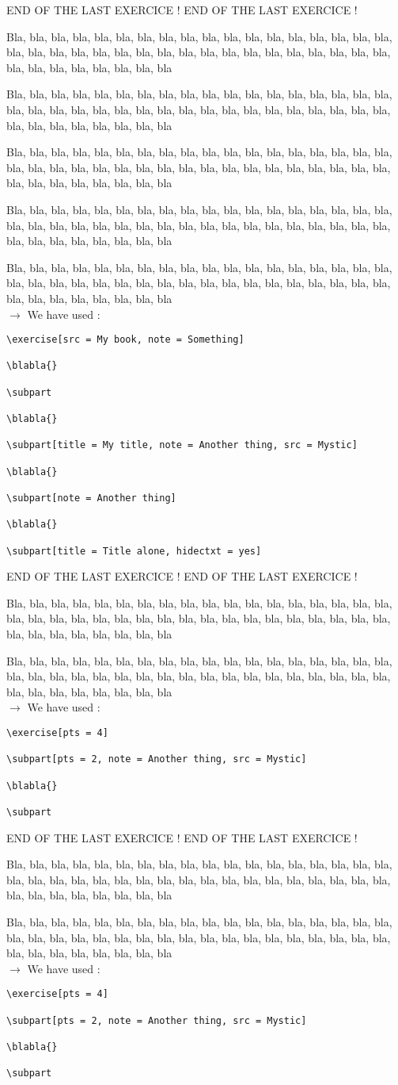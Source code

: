 \documentclass[12pt]{article}
\newcommand\blabla{%
		\noindent Bla, bla, bla, bla, bla, bla, bla, bla, bla, bla, bla,
		bla, bla, bla, bla, bla, bla, bla, bla, bla, bla, bla,
		bla, bla, bla, bla, bla, bla, bla, bla, bla, bla, bla,
		bla, bla, bla, bla, bla, bla, bla, bla, bla, bla, bla
	}
\newcommand\codeused{
		\blabla{} \medskip  \\ \noindent $\rightarrow$ We have used :
	}
\begin{document}
\newpage \medskip \noindent END OF THE LAST EXERCICE ! END OF THE LAST EXERCICE !

\exercise[src = My book, note = Something]
      
\blabla{}

\subpart

\blabla{}

\subpart[pts = 2, title = My title, note = Another thing, src = Mystic]

\blabla{}

\subpart[note = Another thing]

\blabla{}

\vspace{3.1cm}

\subpart[title = Title alone, hidectxt = yes]


\codeused{}

\begin{verbatim}
\exercise[src = My book, note = Something]

\blabla{}

\subpart

\blabla{}

\subpart[title = My title, note = Another thing, src = Mystic]

\blabla{}

\subpart[note = Another thing]

\blabla{}

\subpart[title = Title alone, hidectxt = yes]

\end{verbatim}



\newpage \medskip \noindent END OF THE LAST EXERCICE ! END OF THE LAST EXERCICE !

\exercise
      
\subpart[pts = 2, note = Another thing, src = Mystic]

\blabla{}

\subpart

\codeused{}

\begin{verbatim}
\exercise[pts = 4]
      
\subpart[pts = 2, note = Another thing, src = Mystic]

\blabla{}

\subpart
\end{verbatim}



\newpage \medskip \noindent END OF THE LAST EXERCICE ! END OF THE LAST EXERCICE !

\exercise[pts = 4]
      
\subpart[pts = 2, note = Another thing, src = Mystic]

\blabla{}

\subpart

\codeused{}

\begin{verbatim}
\exercise[pts = 4]
      
\subpart[pts = 2, note = Another thing, src = Mystic]

\blabla{}

\subpart
\end{verbatim}
\end{document}
